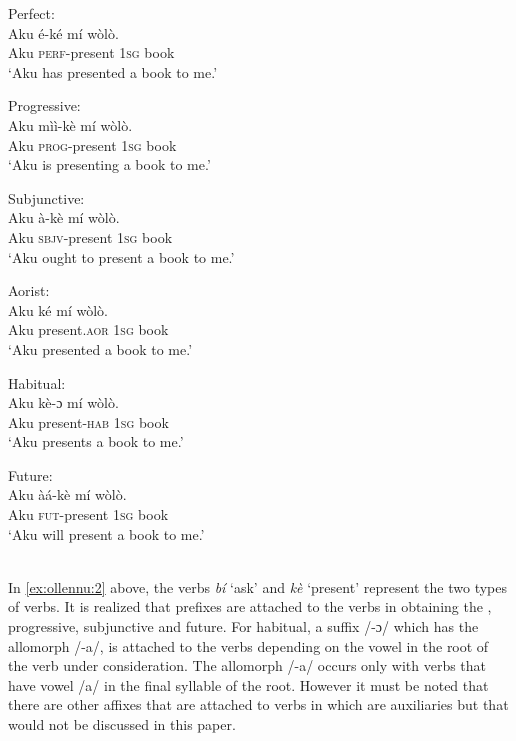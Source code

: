 \documentclass[output=paper
,newtxmath
,modfonts
,nonflat]{langsci/langscibook}
\begin{document}
\begin{minipage}{.5\textwidth}
\ea \label{ex:ollennu:46} 
Perfect:\\
\gll Aku \'e-k\'e m\'i w\`ol\`o.\\
Aku \textsc{perf}-present 1\textsc{sg} book\\
\glt 	`Aku has presented a book to me.'

\ex Progressive:\\
\gll Aku m\`i\`i-k\`e m\'i w\`ol\`o.\\
Aku \textsc{prog}-present 1\textsc{sg} book\\
\glt `Aku is presenting a book to me.'

\ex Subjunctive:\\
\gll Aku \`a-k\`e m\'i w\`ol\`o.\\
Aku \textsc{sbjv}-present 1\textsc{sg} book\\
\glt `Aku ought to present a book to me.'
\z
\end{minipage}
\begin{minipage}{.5\textwidth}
\ea Aorist:\\
\gll Aku k\'e m\'i w\`ol\`o.\\
Aku present.\textsc{aor} 1\textsc{sg} book\\
\glt `Aku presented a book to me.'

\ex Habitual:\\
\gll Aku k\`e-ɔ m\'i w\`ol\`o.\\
Aku present-\textsc{hab} 1\textsc{sg} book\\
\glt `Aku presents a book to me.'

\ex Future:\\
\gll Aku \`a\'a-k\`e m\'i w\`ol\`o.\\
Aku \textsc{fut}-present 1\textsc{sg} book\\
\glt `Aku will present a book to me.'
\z
\end{minipage}\\

In \ref{ex:ollennu:2} above, the verbs  \textit{b\'i} `ask' and \textit{k\`e} `present' represent the two types of verbs. It is realized that prefixes are attached to the verbs in obtaining the , progressive, subjunctive and future. For habitual, a suffix /-ɔ/ which has the allomorph /-a/, is attached to the verbs depending on the vowel in the root of the verb under consideration. The allomorph /-a/ occurs only with verbs that have vowel /a/ in the final syllable of the root. However it must be noted that there are other affixes that are attached to verbs in  which are auxiliaries but that would not be discussed in this paper.
\end{document}
